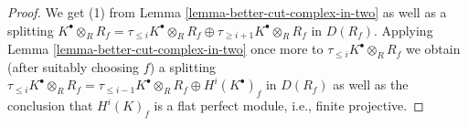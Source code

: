\documentclass[10pt,a4paper]{amsart}
\theoremstyle{plain}
\theoremstyle{definition}
\theoremstyle{remark}
\numberwithin{equation}{subsection}
\begin{document}
\begin{proof}
We get (1) from Lemma \ref{lemma-better-cut-complex-in-two} as well
as a splitting
$K^\bullet \otimes_R R_f = \tau_{\leq i}K^\bullet \otimes_R R_f \oplus
\tau_{\geq i + 1}K^\bullet \otimes_R R_f$
in $D(R_f)$. Applying Lemma \ref{lemma-better-cut-complex-in-two} once
more to $\tau_{\leq i}K^\bullet \otimes_R R_f$
we obtain (after suitably choosing $f$) a splitting
$\tau_{\leq i}K^\bullet \otimes_R R_f =
\tau_{\leq i - 1}K^\bullet \otimes_R R_f \oplus H^i(K^\bullet)_f$ in $D(R_f)$
as well as the conclusion that $H^i(K)_f$ is a flat perfect module, i.e.,
finite projective.
\end{proof}
\end{document}
